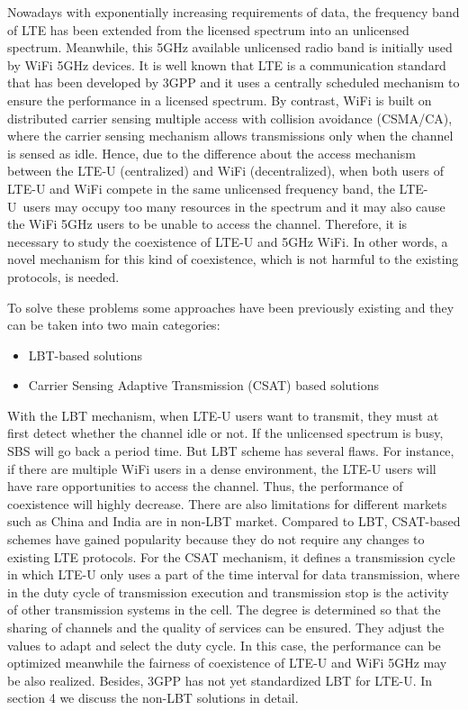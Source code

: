 \documentclass{IEEEtran}
\begin{document}
Nowadays with exponentially increasing requirements of data, the frequency band of LTE has been extended from the licensed spectrum into an unlicensed spectrum. Meanwhile, this 5GHz available unlicensed radio band is initially used by WiFi 5GHz devices. It is well known that LTE is a communication standard that has been developed by 3GPP \cite{BenHafaiedh2018a} and it uses a centrally scheduled mechanism to ensure the performance in a licensed spectrum. By contrast, WiFi is built on distributed carrier sensing multiple access with collision avoidance (CSMA/CA), where the carrier sensing mechanism allows transmissions only when the channel is sensed as idle. Hence, due to the difference about the access mechanism between the LTE-U (centralized) and WiFi (decentralized), when both users of LTE-U and WiFi compete in the same unlicensed frequency band, the LTE-U users may occupy too many resources in the spectrum and it may also cause the WiFi 5GHz users to be unable to access the channel. Therefore, it is necessary to study the coexistence of LTE-U and 5GHz WiFi. In other words, a novel mechanism for this kind of coexistence, which is not harmful to the existing protocols, is needed.

To solve these problems some approaches have been previously existing and they can be taken into two main categories:
\begin{itemize}
    \item LBT-based solutions
    \item Carrier Sensing Adaptive Transmission (CSAT) based solutions
\end{itemize}
 With the LBT mechanism, when LTE-U users want to transmit, they must at first detect whether the channel idle or not. If the unlicensed spectrum is busy, SBS will go back a period time. But LBT scheme has several flaws. For instance, if there are multiple WiFi users in a dense environment, the LTE-U users will have rare opportunities to access the channel. Thus, the performance of coexistence will highly decrease. There are also limitations for different markets such as China and India are in non-LBT market. Compared to LBT, CSAT-based schemes have gained popularity because they do not require any changes to existing LTE protocols. For the CSAT mechanism, it defines a transmission cycle in which LTE-U only uses a part of the time interval for data transmission, where in the duty cycle of transmission execution and transmission stop is the activity of other transmission systems in the cell. The degree is determined so that the sharing of channels and the quality of services can be ensured. They adjust the values to adapt and select the duty cycle. In this case, the performance can be optimized meanwhile the fairness of coexistence of LTE-U and WiFi 5GHz may be also realized. Besides, 3GPP has not yet standardized LBT for LTE-U. In section 4 we discuss the non-LBT solutions in detail.
\end{document}
